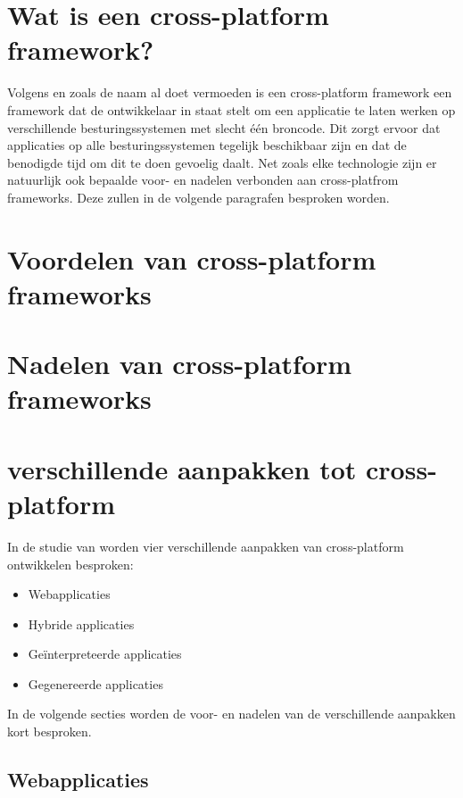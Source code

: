 \section{Wat is een cross-platform framework?}

 Volgens \textcite{El-Kassas2014} en zoals de naam al doet vermoeden is een cross-platform framework een framework dat de ontwikkelaar in staat stelt om een applicatie te laten werken op verschillende besturingssystemen met slecht één broncode. Dit zorgt ervoor dat applicaties op alle besturingssystemen tegelijk beschikbaar zijn en dat de benodigde tijd om dit te doen gevoelig daalt. Net zoals elke technologie zijn er natuurlijk ook bepaalde voor- en nadelen verbonden aan cross-platfrom frameworks. Deze zullen in de volgende paragrafen besproken worden.
 
\section{Voordelen van cross-platform frameworks}



\section{Nadelen van cross-platform frameworks}

\section{verschillende aanpakken tot cross-platform}
 
 In de studie van \textcite{Xanthopoulos2013} worden vier verschillende aanpakken van cross-platform ontwikkelen besproken:
 
 \begin{itemize}
     \item Webapplicaties
     \item Hybride applicaties
     \item Geïnterpreteerde applicaties
     \item Gegenereerde applicaties
 \end{itemize}

In de volgende secties worden de voor- en nadelen van de verschillende aanpakken kort besproken.

\subsection{Webapplicaties}


